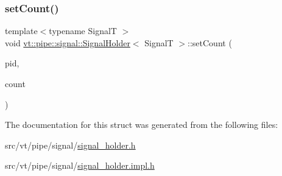 \mbox{\label{structvt_1_1pipe_1_1signal_1_1_signal_holder_aa15cf43c4602a9d866f8060746696a45}} 
\subsubsection{\texorpdfstring{set\+Count()}{setCount()}}
{\footnotesize\ttfamily template$<$typename SignalT $>$ \\
void \hyperlink{structvt_1_1pipe_1_1signal_1_1_signal_holder}{vt\+::pipe\+::signal\+::\+Signal\+Holder}$<$ SignalT $>$\+::set\+Count (\begin{DoxyParamCaption}\item[{\hyperlink{namespacevt_ac9852acda74d1896f48f406cd72c7bd3}{Pipe\+Type} const \&}]{pid,  }\item[{\hyperlink{structvt_1_1pipe_1_1signal_1_1_signal_holder_aced54515f402b63f6dea174e5b027c81}{Sig\+Count\+Type} const \&}]{count }\end{DoxyParamCaption})}



The documentation for this struct was generated from the following files\+:\begin{DoxyCompactItemize}
\item 
src/vt/pipe/signal/\hyperlink{signal__holder_8h}{signal\+\_\+holder.\+h}\item 
src/vt/pipe/signal/\hyperlink{signal__holder_8impl_8h}{signal\+\_\+holder.\+impl.\+h}\end{DoxyCompactItemize}
